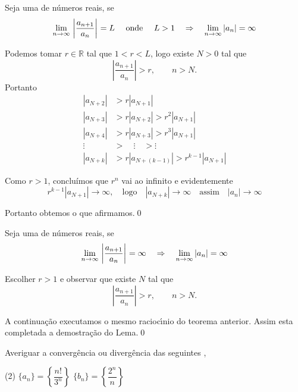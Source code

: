 \begin{theoc}{}{}
Seja  uma \seq de n\'{u}meros reais, se
\begin{equation*}
 \displaystyle{\lim_{n\to \infty}\,{\left|\frac{a_{n+1}}{a_{n}}\right|}_{}}=L\quad \text{ onde  }\quad L>1\quad 
 \Rightarrow\quad \lim_{n\to\infty}|a_n|=\infty
\end{equation*}
\end{theoc}

\prova Podemos tomar $r\in \mathbb{R}$ tal que $1<r<L$, logo
existe $N>0$ tal que
\begin{equation*}
    \left|\frac{a_{n+1}}{a_{n}}\right|>r,\qquad n> N.
\end{equation*}
Portanto
\begin{align*}
|a_{N+2}|&>r|a_{N+1}|\\[2ex]
|a_{N+3}|&>r|a_{N+2}|>r^2|a_{N+1}|\\[2ex]
|a_{N+4}|&>r|a_{N+3}|>r^3|a_{N+1}|\\[2ex]
\vdots\quad &>\quad\vdots\quad> \vdots\\[2ex]
|a_{N+k}|&>r|a_{N+(k-1)}|>r^{k-1}|a_{N+1}|
\end{align*}

Como $r>1$, concluímos que $r^n$ vai ao infinito e evidentemente
\begin{equation*}
r^{k-1}|a_{N+1}|\to\infty,\quad \text{logo}\quad
|a_{N+k}|\to\infty\quad\text{assim}\quad |a_n|\to\infty
\end{equation*}

Portanto obtemos o que afirmamos.\qed

\begin{lema}
Seja  uma \seq de n\'{u}meros reais, se
\begin{equation*}
 \displaystyle{\lim_{n\to \infty}\,{\left|\frac{a_{n+1}}{a_{n}}\right|}_{}}=\infty\quad \Rightarrow 
 \quad \lim_{n\to\infty}|a_n|=\infty
\end{equation*}
\end{lema}

\prova Escolher $r>1$ e observar que existe $N$ tal que
\begin{equation*}
    \left|\frac{a_{n+1}}{a_{n}}\right|>r,\qquad n> N.
\end{equation*}

A continua\c{c}\~{a}o executamos o mesmo racioc\'{\i}nio do teorema anterior.
Assim esta completada a demostra\c{c}\~{a}o do Lema.\qed

\begin{exem}
Averiguar a converg\^{e}ncia ou diverg\^{e}ncia das seguintes \seqs,
\begin{tasks}[label=\rm{(\alph*)},item-indent=4em,label-width=4ex,ref=\rm{(\alph*)}](2)
\task \(\{a_n\}=\left\{\dfrac{n!}{3^n} \right\}\)
\task \(\{b_n\}=\left\{\dfrac{2^n}{n} \right\}\)
\end{tasks}
\end{exem}

